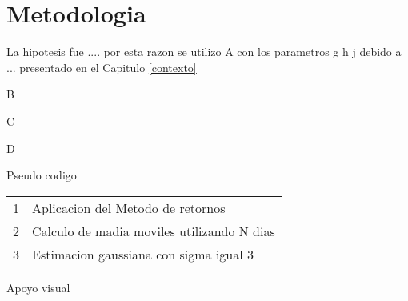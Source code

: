 %
\chapter{Metodologia}
\label{Metodologia}

La hipotesis fue ....
por esta razon se utilizo 
A  con los parametros g h j debido a ... presentado en el Capitulo \ref{contexto}

B 

C


D


Pseudo codigo 
\begin{center}
	\begin{tabular}{ |r l| }
		 \hline
		1 & Aplicacion del Metodo de retornos\\
		2 & Calculo de madia moviles utilizando N dias\\ 
		3 & Estimacion gaussiana con sigma igual 3 \\
		 \hline
	\end{tabular}
\end{center}



Apoyo visual 